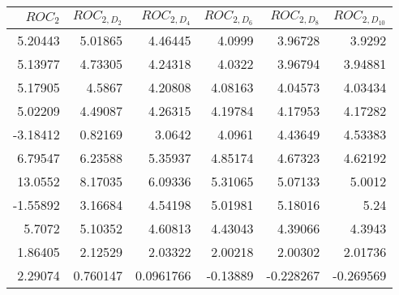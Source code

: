 \begin{tabular}{rrrrrr}
\toprule
$ROC_{2}$ & $ROC_{2,D_2}$ & $ROC_{2,D_4}$ & $ROC_{2,D_6}$ & $ROC_{2,D_8}$ & $ROC_{2,D_{10}}$ \\
\midrule
5.20443 & 5.01865 & 4.46445 & 4.0999 & 3.96728 & 3.9292 \\
5.13977 & 4.73305 & 4.24318 & 4.0322 & 3.96794 & 3.94881 \\
5.17905 & 4.5867 & 4.20808 & 4.08163 & 4.04573 & 4.03434 \\
5.02209 & 4.49087 & 4.26315 & 4.19784 & 4.17953 & 4.17282 \\
-3.18412 & 0.82169 & 3.0642 & 4.0961 & 4.43649 & 4.53383 \\
6.79547 & 6.23588 & 5.35937 & 4.85174 & 4.67323 & 4.62192 \\
13.0552 & 8.17035 & 6.09336 & 5.31065 & 5.07133 & 5.0012 \\
-1.55892 & 3.16684 & 4.54198 & 5.01981 & 5.18016 & 5.24 \\
5.7072 & 5.10352 & 4.60813 & 4.43043 & 4.39066 & 4.3943 \\
1.86405 & 2.12529 & 2.03322 & 2.00218 & 2.00302 & 2.01736 \\
2.29074 & 0.760147 & 0.0961766 & -0.13889 & -0.228267 & -0.269569 \\
\bottomrule
\end{tabular}
